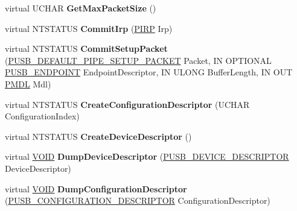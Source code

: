 \begin{DoxyCompactItemize}
virtual U\+C\+H\+AR {\bfseries Get\+Max\+Packet\+Size} ()
\item 
\mbox{\label{class_c_u_s_b_device_a583381753a71eaf1591c256ad0a95243}} 
virtual N\+T\+S\+T\+A\+T\+US {\bfseries Commit\+Irp} (\hyperlink{interfacevoid}{P\+I\+RP} Irp)
\item 
\mbox{\label{class_c_u_s_b_device_a6d20fa54a6af12d8067e3a3b883218a8}} 
virtual N\+T\+S\+T\+A\+T\+US {\bfseries Commit\+Setup\+Packet} (\hyperlink{struct___u_s_b___d_e_f_a_u_l_t___p_i_p_e___s_e_t_u_p___p_a_c_k_e_t}{P\+U\+S\+B\+\_\+\+D\+E\+F\+A\+U\+L\+T\+\_\+\+P\+I\+P\+E\+\_\+\+S\+E\+T\+U\+P\+\_\+\+P\+A\+C\+K\+ET} Packet, IN O\+P\+T\+I\+O\+N\+AL \hyperlink{struct___u_s_b___e_n_d_p_o_i_n_t}{P\+U\+S\+B\+\_\+\+E\+N\+D\+P\+O\+I\+NT} Endpoint\+Descriptor, IN U\+L\+O\+NG Buffer\+Length, IN O\+UT \hyperlink{interfacevoid}{P\+M\+DL} Mdl)
\item 
\mbox{\label{class_c_u_s_b_device_a9606b46005c1ebd07ab7c575cc5c15f5}} 
virtual N\+T\+S\+T\+A\+T\+US {\bfseries Create\+Configuration\+Descriptor} (U\+C\+H\+AR Configuration\+Index)
\item 
\mbox{\label{class_c_u_s_b_device_a39ebea64b770e6521d293d5dc1c11d48}} 
virtual N\+T\+S\+T\+A\+T\+US {\bfseries Create\+Device\+Descriptor} ()
\item 
\mbox{\label{class_c_u_s_b_device_a3e97a0966e50de79ba8be9869b256579}} 
virtual \hyperlink{interfacevoid}{V\+O\+ID} {\bfseries Dump\+Device\+Descriptor} (\hyperlink{struct___u_s_b___d_e_v_i_c_e___d_e_s_c_r_i_p_t_o_r}{P\+U\+S\+B\+\_\+\+D\+E\+V\+I\+C\+E\+\_\+\+D\+E\+S\+C\+R\+I\+P\+T\+OR} Device\+Descriptor)
\item 
\mbox{\label{class_c_u_s_b_device_a377c9bcdcd31365d197f68582071e9d5}} 
virtual \hyperlink{interfacevoid}{V\+O\+ID} {\bfseries Dump\+Configuration\+Descriptor} (\hyperlink{struct___u_s_b___c_o_n_f_i_g_u_r_a_t_i_o_n___d_e_s_c_r_i_p_t_o_r}{P\+U\+S\+B\+\_\+\+C\+O\+N\+F\+I\+G\+U\+R\+A\+T\+I\+O\+N\+\_\+\+D\+E\+S\+C\+R\+I\+P\+T\+OR} Configuration\+Descriptor)
\item 
\mbox{\label{class_c_u_s_b_device_a5e86e9c20daf4f2ad4874d2c7e729761}} 

\end{DoxyCompactItemize}
